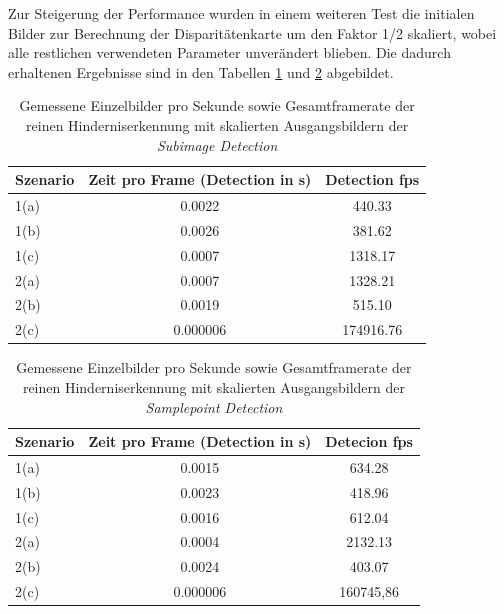 \noindent
Zur Steigerung der Performance wurden in einem weiteren Test die initialen Bilder zur Berechnung der Disparitätenkarte um den Faktor 1/2 skaliert, wobei alle restlichen verwendeten Parameter unverändert blieben. Die dadurch erhaltenen Ergebnisse sind in den Tabellen \ref{tbl:performance_scaled_subimage} und \ref{tbl:performance_scaled_samplepoint} abgebildet.

\begin{table}[h]
\centering
\begin{tabular}{|l|c|c|}
\hline
Szenario & Zeit pro Frame (Detection in s) & Detection fps \\ \hline\hline
1(a)	 & 0.0022					  & 440.33        \\ \hline
1(b)     & 0.0026                     & 381.62        \\ \hline
1(c)     & 0.0007                     & 1318.17       \\ \hline\hline
2(a)     & 0.0007                     & 1328.21       \\ \hline
2(b)     & 0.0019                   	  & 515.10   	  \\ \hline
2(c)     & 0.000006                   & 174916.76     \\ \hline
\end{tabular}
\caption{Gemessene Einzelbilder pro Sekunde sowie Gesamtframerate der reinen Hinderniserkennung mit skalierten Ausgangsbildern der \emph{Subimage Detection}}
\label{tbl:performance_scaled_subimage}
\end{table}

\begin{table}[h]
\centering
\begin{tabular}{|l|c|c|}
\hline
Szenario & Zeit pro Frame (Detection in s) & Detecion fps \\ \hline\hline
1(a)	 & 0.0015				      & 634.28		 \\ \hline
1(b)     & 0.0023                     & 418.96   	 \\ \hline
1(c)     & 0.0016                     & 612.04       \\ \hline\hline
2(a)     & 0.0004                     & 2132.13      \\ \hline
2(b)     & 0.0024                     & 403.07       \\ \hline
2(c)     & 0.000006                   & 160745,86    \\ \hline
\end{tabular}
\caption{Gemessene Einzelbilder pro Sekunde sowie Gesamtframerate der reinen Hinderniserkennung mit skalierten Ausgangsbildern der \emph{Samplepoint Detection}}
\label{tbl:performance_scaled_samplepoint}
\end{table}

